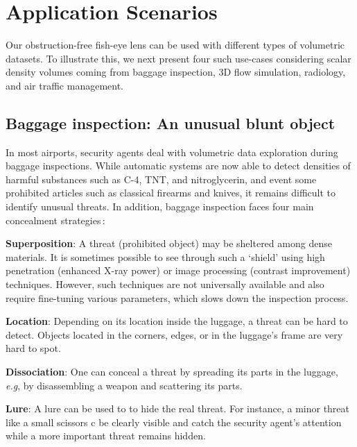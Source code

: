 \section{Application Scenarios}
\label{sec:scenarios}
%
Our obstruction-free fish-eye lens can be used with different types of volumetric datasets. To illustrate this, we next present four such use-cases considering scalar density volumes coming from baggage inspection, 3D flow simulation, radiology, and air traffic management.

\subsection{Baggage inspection: An unusual blunt object}
\label{sec:baggage}
%
In most airports, security agents deal with volumetric data exploration during baggage inspections. While automatic systems are now able to detect densities of harmful substances such as C-4, TNT, and nitroglycerin, and event some prohibited articles such as classical firearms and knives, it remains difficult to identify unusual threats. In addition, baggage inspection faces four main concealment strategies\,\cite{7819413}:

\vspace{0.15cm}
\noindent\textbf{Superposition}: A threat (prohibited object) may be sheltered among dense materials. It is sometimes possible to see through such a `shield' using high penetration (enhanced X-ray power) or image processing (contrast improvement) techniques. However, such techniques are not universally available and also require fine-tuning various parameters, which slows down the inspection process.

\vspace{0.15cm}
\noindent\textbf{Location}: Depending on its location inside the luggage, a threat can be hard to detect. Objects located in the corners, edges, or in the luggage’s frame are very hard to spot.

\vspace{0.15cm}
\noindent\textbf{Dissociation}: One can conceal a threat by spreading its parts in the luggage, \emph{e.g}, by disassembling a weapon and scattering its parts.

\vspace{0.15cm}
\noindent\textbf{Lure}: A lure can be used to to hide the real threat. For instance, a minor threat like a small scissors c be clearly visible and catch the security agent's attention while a more important threat remains hidden.

